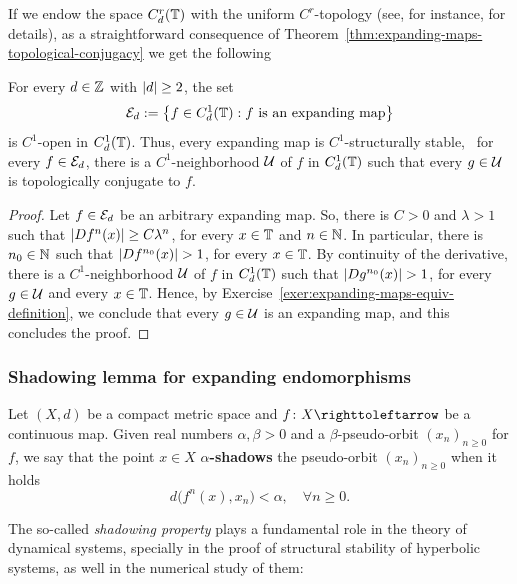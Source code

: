 If we endow the space $C^r_d(\mathbb{T})$ with the uniform $C^r$-topology (see, for instance, \cite[Chapter 2]{HirschDiffTopology} for details), as a straightforward consequence of Theorem~\ref{thm:expanding-maps-topological-conjugacy} we get the following

\begin{corollary}
  For every $d\in\mathbb{Z}$ with $\left\lvert{d}\right\rvert\geq 2$, the set
  \begin{displaymath}
    \mathcal{E}_d:=\left\{f\in C^1_d(\mathbb{T}) : f \text{ is an expanding map}\right\}
  \end{displaymath}
  is $C^1$-open in $C_d^1(\mathbb{T})$. Thus, every expanding map is $C^1$-structurally stable, \ie~for every $f\in\mathcal{E}_d$, there is a $C^1$-neighborhood $\mathcal{U}$ of $f$ in $C_d^1(\mathbb{T})$ such that every $g\in\mathcal{U}$ is topologically conjugate to $f$.
\end{corollary}

\begin{proof}
  Let $f\in\mathcal{E}_d$ be an arbitrary expanding map. So, there is $C>0$ and $\lambda>1$ such that $\left\lvert{Df^n(x)}\right\rvert\geq C\lambda^n$, for every $x\in\mathbb{T}$ and $n\in\mathbb{N}$. In particular, there is $n_0\in\mathbb{N}$ such that $\left\lvert{Df^{n_0}(x)}\right\rvert>1$, for every $x\in\mathbb{T}$. By continuity of the derivative, there is a $C^1$-neighborhood $\mathcal{U}$ of $f$ in $C_d^1(\mathbb{T})$ such that $\left\lvert{Dg^{n_0}(x)}\right\rvert>1$, for every $g\in\mathcal{U}$ and every $x\in\mathbb{T}$. Hence, by Exercise~\ref{exer:expanding-maps-equiv-definition}, we conclude that every $g\in\mathcal{U}$ is an expanding map, and this concludes the proof.
\end{proof}


\subsubsection{Shadowing lemma for expanding endomorphisms}
\label{sec:shadowing-lemma-expandindg-circle}

Let $(X,d)$ be a compact metric space and $f\colon X\carr$ be a continuous map. Given real numbers $\alpha,\beta>0$ and a $\beta$-pseudo-orbit $(x_n)_{n\geq 0}$ for $f$, we say that the point $x\in X$ \textbf{$\alpha$-shadows} the pseudo-orbit $(x_n)_{n\geq 0}$ when it holds
\begin{displaymath}
  d\big(f^n(x),x_n\big)<\alpha, \quad\forall n\geq 0.
\end{displaymath}

The so-called \emph{shadowing property} plays a fundamental role in the theory of dynamical systems, specially in the proof of structural stability of hyperbolic systems, as well in the numerical study of them:


